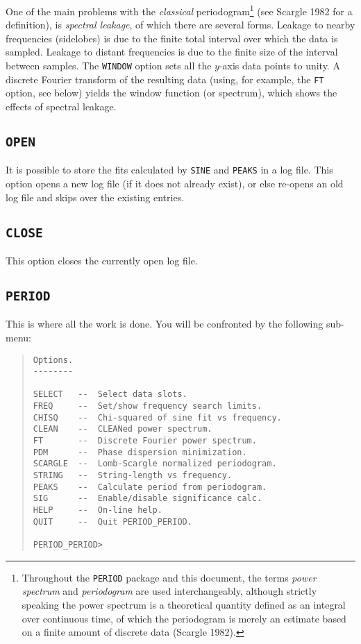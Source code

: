 One of the main problems with the {\em classical}
periodogram\footnote{Throughout the {\tt PERIOD} package and this document, the
terms {\em power spectrum} and {\em periodogram} are used interchangeably,
although strictly speaking the power spectrum is a theoretical quantity defined
as an integral over continuous time, of which the periodogram is merely an
estimate based on a finite amount of discrete data (Scargle 1982).}  (see
Scargle 1982 for a definition), is {\em spectral leakage}, of which there are
several forms. Leakage to nearby frequencies (sidelobes) is due to the finite
total interval over which the data is sampled. Leakage to distant frequencies
is due to the finite size of the interval between samples. The {\tt WINDOW}
option sets all the $y$-axis data points to unity. A discrete Fourier transform
of the resulting data (using, for example, the {\tt FT} option, see below)
yields the window function (or spectrum), which shows the effects of spectral
leakage. 

\subsection*{\tt OPEN}

It is possible to store the fits calculated by {\tt SINE} and {\tt PEAKS} in a
log file. This option opens a new log file (if it does not already exist), or
else re-opens an old log file and skips over the existing entries. 

\subsection*{\tt CLOSE}

This option closes the currently open log file. 

\subsection*{\tt PERIOD}

This is where all the work is done. You will be confronted by the following 
sub-menu: 

\begin{quote}
\begin{verbatim}
Options.
--------

SELECT   --  Select data slots.
FREQ     --  Set/show frequency search limits.
CHISQ    --  Chi-squared of sine fit vs frequency.
CLEAN    --  CLEANed power spectrum.
FT       --  Discrete Fourier power spectrum.
PDM      --  Phase dispersion minimization.
SCARGLE  --  Lomb-Scargle normalized periodogram.
STRING   --  String-length vs frequency.
PEAKS    --  Calculate period from periodogram.
SIG      --  Enable/disable significance calc.
HELP     --  On-line help.
QUIT     --  Quit PERIOD_PERIOD.

PERIOD_PERIOD> 
\end{verbatim}
\end{quote}

